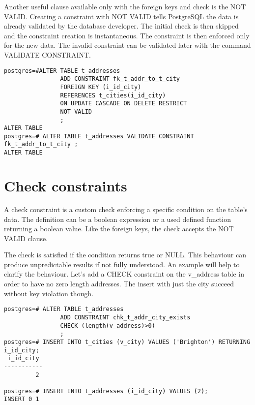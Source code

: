 Another useful clause available only with the foreign keys and check is the NOT VALID. Creating a constraint with NOT VALID tells PostgreSQL the data is already
validated by the database developer. The initial check is then skipped and the constraint creation is
instantaneous. The constraint is then 
enforced only for the new data. The invalid constraint can be validated later with the command VALIDATE
CONSTRAINT.

\begin{lstlisting}[style=pgsql]
postgres=#ALTER TABLE t_addresses
                ADD CONSTRAINT fk_t_addr_to_t_city
                FOREIGN KEY (i_id_city)
                REFERENCES t_cities(i_id_city)
                ON UPDATE CASCADE ON DELETE RESTRICT
                NOT VALID
                ;
ALTER TABLE
postgres=# ALTER TABLE t_addresses VALIDATE CONSTRAINT fk_t_addr_to_t_city ;
ALTER TABLE

\end{lstlisting}



\section{Check constraints}
\label{sec:CHECKCNS}

A check constraint is a custom check enforcing a specific condition on the table's data.  The definition
can be a boolean expression or a used defined function returning a boolean value. Like the foreign
keys, the check accepts the NOT VALID clause.\newline

The check is satisfied if the condition returns true or NULL. This behaviour can produce unpredictable
results if not fully understood. An example will help to clarify the behaviour. Let's add
a CHECK constraint on the v\_address table in order to have no zero length addresses. The insert with
just the city succeed without key violation though.

\begin{lstlisting}[style=pgsql]
postgres=# ALTER TABLE t_addresses
                ADD CONSTRAINT chk_t_addr_city_exists
                CHECK (length(v_address)>0)
                ; 
postgres=# INSERT INTO t_cities (v_city) VALUES ('Brighton') RETURNING i_id_city;
 i_id_city 
-----------
         2

postgres=# INSERT INTO t_addresses (i_id_city) VALUES (2);
INSERT 0 1
\end{lstlisting}


